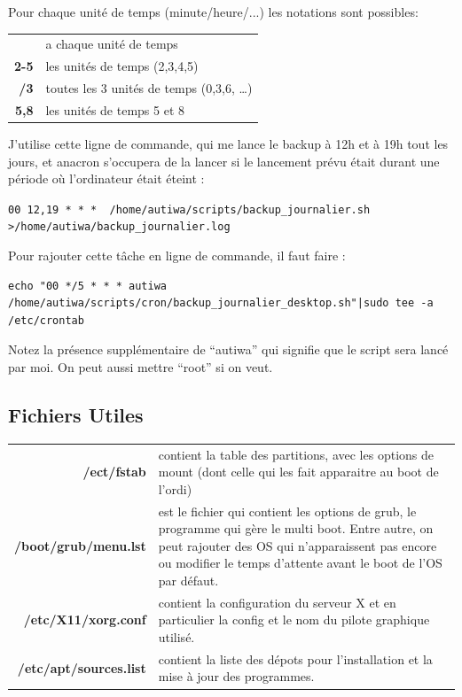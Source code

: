 \documentclass[a4paper,twoside]{article}
\begin{document}
\bigskip

Pour chaque unité de temps (minute/heure/...) les notations sont possibles:

\begin{tabular}{>{\bfseries}r<{}@{ : }p{11cm}}
* & a chaque unité de temps\\
2-5 & les unités de temps (2,3,4,5)\\
*/3 & toutes les 3 unités de temps (0,3,6, \dots)\\
5,8 & les unités de temps 5 et 8
\end{tabular}

\bigskip

J'utilise cette ligne de commande, qui me lance le backup à 12h et à 19h tout les jours, et anacron s'occupera de la lancer si le lancement prévu était durant une période où l'ordinateur était éteint :

\begin{footnotesize}\verb|00 12,19 * * *  /home/autiwa/scripts/backup_journalier.sh >/home/autiwa/backup_journalier.log|\end{footnotesize}

Pour rajouter cette tâche en ligne de commande, il faut faire :
\begin{footnotesize}
\begin{verbatim}
echo "00 */5 * * * autiwa /home/autiwa/scripts/cron/backup_journalier_desktop.sh"|sudo tee -a /etc/crontab
\end{verbatim}
\end{footnotesize}

\begin{remarque}
Notez la présence supplémentaire de ``autiwa'' qui signifie que le script sera lancé par moi. On peut aussi mettre ``root'' si on veut.
\end{remarque}

\subsection{Fichiers Utiles}

\begin{tabular}{>{\bfseries}r<{}@{ : }p{9cm}}
/ect/fstab & contient la table des partitions, avec les options de mount (dont celle qui les fait apparaitre au boot de l'ordi) \\
/boot/grub/menu.lst & est le fichier qui contient les options de grub, le programme qui gère le multi boot. Entre autre, on peut rajouter des OS qui n'apparaissent pas encore ou modifier le temps d'attente avant le boot de l'OS par défaut.\\
/etc/X11/xorg.conf & contient la configuration du serveur X et en particulier la config et le nom du pilote graphique utilisé.\\
/etc/apt/sources.list & contient la liste des dépots pour l'installation et la mise à jour des programmes.\\
\end{tabular}
\end{document}
